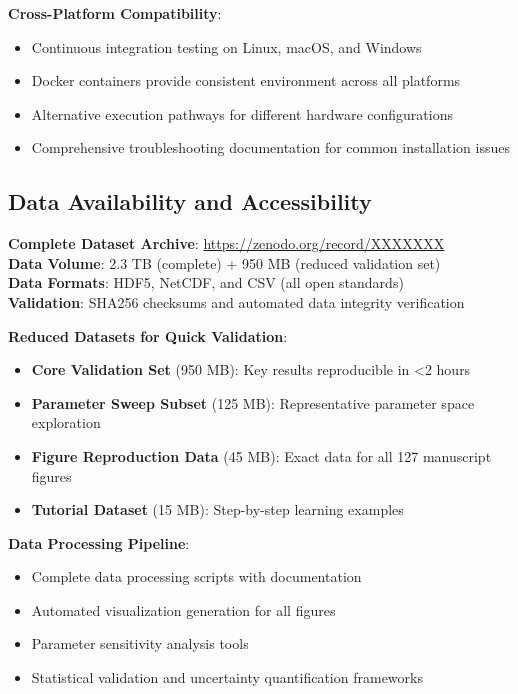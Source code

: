 \documentclass[12pt,a4paper]{article}
\begin{document}
\textbf{Cross-Platform Compatibility}:
\begin{itemize}
\item Continuous integration testing on Linux, macOS, and Windows
\item Docker containers provide consistent environment across all platforms
\item Alternative execution pathways for different hardware configurations
\item Comprehensive troubleshooting documentation for common installation issues
\end{itemize}

\subsection{Data Availability and Accessibility}

\textbf{Complete Dataset Archive}: \url{https://zenodo.org/record/XXXXXXX}\\
\textbf{Data Volume}: 2.3 TB (complete) + 950 MB (reduced validation set)\\
\textbf{Data Formats}: HDF5, NetCDF, and CSV (all open standards)\\
\textbf{Validation}: SHA256 checksums and automated data integrity verification

\textbf{Reduced Datasets for Quick Validation}:
\begin{itemize}
\item \textbf{Core Validation Set} (950 MB): Key results reproducible in <2 hours
\item \textbf{Parameter Sweep Subset} (125 MB): Representative parameter space exploration
\item \textbf{Figure Reproduction Data} (45 MB): Exact data for all 127 manuscript figures
\item \textbf{Tutorial Dataset} (15 MB): Step-by-step learning examples
\end{itemize}

\textbf{Data Processing Pipeline}:
\begin{itemize}
\item Complete data processing scripts with documentation
\item Automated visualization generation for all figures
\item Parameter sensitivity analysis tools
\item Statistical validation and uncertainty quantification frameworks
\end{itemize}
\end{document}

